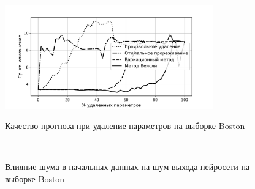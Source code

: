 \begin{figure}[h!t]\center
\includegraphics[width=0.8\textwidth]{results/relevant/Boston/All.pdf}\\
\caption{Качество прогноза при удаление параметров на выборке Boston}
\label{BostonAll}
\end{figure}

\begin{figure}[h!t]\center
{}
\\
\caption{Влияние шума в начальных данных на шум выхода нейросети на выборке Boston}
\label{BostonNoise}
\end{figure}

